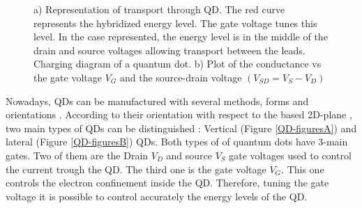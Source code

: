 \begin{figure}[t]
     \centering
    
     \caption{ a) Representation of transport through QD. The red curve represents the hybridized energy level. The gate voltage tunes this level. In the case represented, the energy level is in the middle of the drain and source voltages allowing transport between the leads.   Charging diagram of a quantum dot. b) Plot of the conductance vs the gate voltage $V_G$ and the source-drain voltage $(V_{SD}=V_{S}-V_{D} )$ \protect{}}
\end{figure}

Nowadays, QDs can be manufactured with several methods, forms and orientations \citep{bimberg_quantum_1999}. According to their orientation with respect to the based 2D-plane , two main types of QDs can be distinguished : Vertical (Figure \ref{QD-figuresA}) and lateral (Figure \ref{QD-figuresB}) QDs. Both types of of quantum dots have $3$-main gates. Two of them are the Drain $V_D$ and source $V_S$ gate voltages used to control the current trough the QD. The third one is the gate voltage $V_G$. This one controls the electron confinement inside the QD. Therefore, tuning the gate voltage it is possible to control accurately the energy levels of the QD. 


